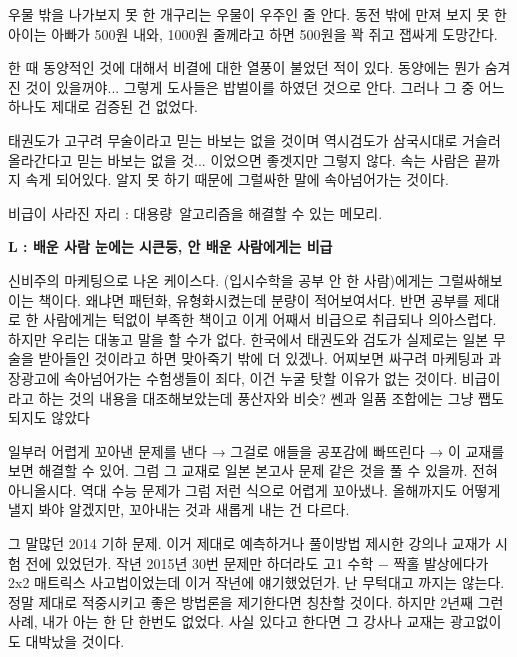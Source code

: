 \vspace{5mm}

우물 밖을 나가보지 못 한 개구리는 우물이 우주인 줄 안다.
동전 밖에 만져 보지 못 한 아이는 아빠가 500원 내와, 1000원 줄께라고 하면 500원을 꽉 쥐고 잽싸게 도망간다.
\vspace{5mm}

한 때 동양적인 것에 대해서 비결에 대한 열풍이 불었던 적이 있다.
동양에는 뭔가 숨겨진 것이 있을꺼야... 그렇게 도사들은 밥벌이를 하였던 것으로 안다.
그러나 그 중 어느 하나도 제대로 검증된 건 없었다.
\vspace{5mm}

태권도가 고구려 무술이라고 믿는 바보는 없을 것이며
역시검도가 삼국시대로 거슬러 올라간다고 믿는 바보는 없을 것... 이었으면 좋겟지만 그렇지 않다.
속는 사람은 끝까지 속게 되어있다. 알지 못 하기 때문에 그럴싸한 말에 속아넘어가는 것이다.
\vspace{5mm}

비급이 사라진 자리 : 대용량 알고리즘을 해결할 수 있는 메모리.
\vspace{5mm}

\textbf{L : 배운 사람 눈에는 시큰둥, 안 배운 사람에게는 비급}
\vspace{5mm}

신비주의 마케팅으로 나온 케이스다.
(입시수학을 공부 안 한 사람)에게는 그럴싸해보이는 책이다. 왜냐면 패턴화, 유형화시켰는데 분량이 적어보여서다.
반면 공부를 제대로 한 사람에게는 턱없이 부족한 책이고 이게 어째서 비급으로 취급되나 의아스럽다.
하지만 우리는 대놓고 말을 할 수가 없다. 한국에서 태권도와 검도가 실제로는 일본 무술을 받아들인 것이라고 하면 맞아죽기 밖에 더 있겠나.
어찌보면 싸구려 마케팅과 과장광고에 속아넘어가는 수험생들이 죄다, 이건 누굴 탓할 이유가 없는 것이다.
비급이라고 하는 것의 내용을 대조해보았는데 풍산자와 비슷? 쎈과 일품 조합에는 그냥 쨉도 되지도 않았다
\vspace{5mm}

일부러 어렵게 꼬아낸 문제를 낸다 → 그걸로 애들을 공포감에 빠뜨린다 → 이 교재를 보면 해결할 수 있어.
그럼 그 교재로 일본 본고사 문제 같은 것을 풀 수 있을까. 전혀 아니올시다.
역대 수능 문제가 그럼 저런 식으로 어렵게 꼬아냈나. 올해까지도 어떻게 낼지 봐야 알겠지만, 꼬아내는 것과 새롭게 내는 건 다르다.
\vspace{5mm}

그 말많던 2014 기하 문제. 이거 제대로 예측하거나 풀이방법 제시한 강의나 교재가 시험 전에 있었던가.
작년 2015년 30번 문제만 하더라도 고1 수학 $-$ 짝홀 발상에다가 2x2 매트릭스 사고법이었는데 이거 작년에 얘기했었던가.
난 무턱대고 까지는 않는다. 정말 제대로 적중시키고 좋은 방법론을 제기한다면 칭찬할 것이다.
하지만 2년째 그런 사례, 내가 아는 한 단 한번도 없었다. 사실 있다고 한다면 그 강사나 교재는 광고없이도 대박났을 것이다.
\vspace{5mm}

